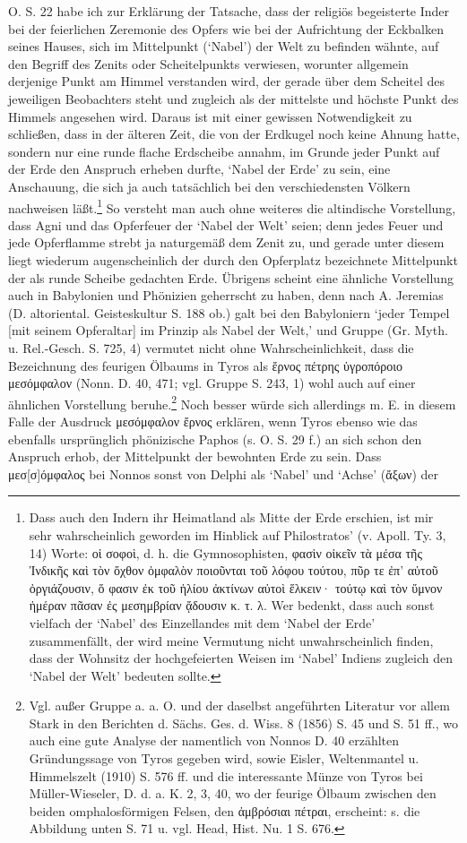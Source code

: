 \documentclass[a4paper, 11pt, oneside]{article}
\begin{document}
O. S. 22 habe ich zur Erklärung der Tatsache, dass der religiös begeisterte Inder bei der feierlichen Zeremonie des Opfers wie bei der Aufrichtung der Eckbalken seines Hauses, sich im Mittelpunkt (`Nabel') der Welt zu befinden wähnte, auf den Begriff des Zenits oder Scheitelpunkts verwiesen, worunter allgemein derjenige Punkt am Himmel verstanden wird, der gerade über dem Scheitel des jeweiligen Beobachters steht und zugleich als der mittelste und höchste Punkt des Himmels angesehen wird. Daraus ist mit einer gewissen Notwendigkeit zu schließen, dass in der älteren Zeit, die von der Erdkugel noch keine Ahnung hatte, sondern nur eine runde flache Erdscheibe annahm, im Grunde jeder Punkt auf der Erde den Anspruch erheben durfte, `Nabel der Erde' zu sein, eine Anschauung, die sich ja auch tatsächlich bei den verschiedensten Völkern nachweisen läßt.\footnote{Dass auch den Indern ihr Heimatland als Mitte der Erde erschien, ist mir sehr wahrscheinlich geworden im Hinblick auf Philostratos' (v. Apoll. Ty. 3, 14) Worte: οἱ σοφοὶ, d. h. die Gymnosophisten, φασὶν οἰκεῖν τὰ μέσα τῆς Ἰνδικῆς καὶ τὸν ὄχθον ὀμφαλὸν ποιοῦνται τοῦ λόφου τούτου, πῦρ τε ἐπ' αὐτοῦ ὀργιάζουσιν, ὅ φασιν ἐκ τοῦ ἡλίου ἀκτίνων αὐτοὶ ἕλκειν· τούτῳ καὶ τὸν ὕμνον ἡμέραν πᾶσαν ἐς μεσημβρίαν ᾄδουσιν κ. τ. λ. Wer bedenkt, dass auch sonst vielfach der `Nabel' des Einzellandes mit dem `Nabel der Erde' zusammenfällt, der wird meine Vermutung nicht unwahrscheinlich finden, dass der Wohnsitz der hochgefeierten Weisen im `Nabel' Indiens zugleich den `Nabel der Welt' bedeuten sollte.} So versteht man auch ohne weiteres die altindische Vorstellung, dass Agni und das Opferfeuer der `Nabel der Welt' seien; denn jedes Feuer und jede Opferflamme strebt ja naturgemäß dem Zenit zu, und gerade unter diesem liegt wiederum augenscheinlich der durch den Opferplatz bezeichnete Mittelpunkt der als runde Scheibe gedachten Erde. Übrigens scheint eine ähnliche Vorstellung auch in Babylonien und Phönizien geherrscht zu haben, denn nach A. Jeremias (D. altoriental. Geisteskultur S. 188 ob.) galt bei den Babyloniern `jeder Tempel [mit seinem Opferaltar] im Prinzip als Nabel der Welt,' und Gruppe (Gr. Myth. u. Rel.-Gesch. S. 725, 4) vermutet nicht ohne Wahrscheinlichkeit, dass die Bezeichnung des feurigen Ölbaums in Tyros als ἔρνος πέτρης ὑγροπόροιο μεσόμφαλον (Nonn. D. 40, 471; vgl. Gruppe S. 243, 1) wohl auch auf einer ähnlichen Vorstellung beruhe.\footnote{Vgl. außer Gruppe a. a. O. und der daselbst angeführten Literatur vor allem Stark in den Berichten d. Sächs. Ges. d. Wiss. 8 (1856) S. 45 und S. 51 ff., wo auch eine gute Analyse der namentlich von Nonnos D. 40 erzählten Gründungssage von Tyros gegeben wird, sowie Eisler, Weltenmantel u. Himmelszelt (1910) S. 576 ff. und die interessante Münze von Tyros bei Müller-Wieseler, D. d. a. K. 2, 3, 40, wo der feurige Ölbaum zwischen den beiden omphalosförmigen Felsen, den ἀμβρόσιαι πέτραι, erscheint: s. die Abbildung unten S. 71 u. vgl. Head, Hist. Nu. 1 S. 676.} Noch besser würde sich allerdings m. E. in diesem Falle der Ausdruck μεσόμφαλον ἔρνος erklären, wenn Tyros ebenso wie das ebenfalls ursprünglich phönizische Paphos (s. O. S. 29 f.) an sich schon den Anspruch erhob, der Mittelpunkt der bewohnten Erde zu sein. Dass μεσ[σ]όμφαλος bei Nonnos sonst von Delphi als `Nabel' und `Achse' (ἄξων) der 
\end{document}
